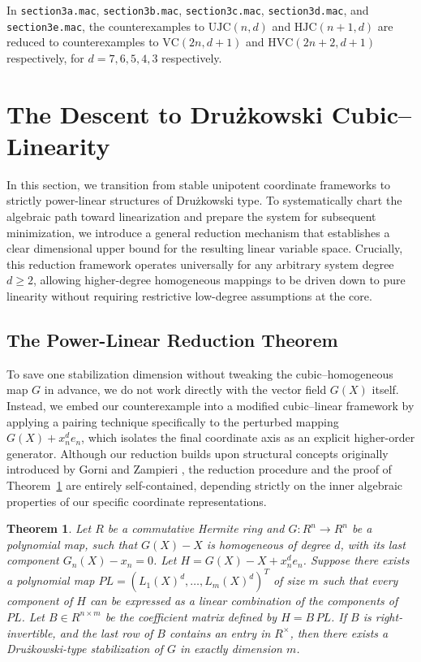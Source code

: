 \documentclass[11pt,a4paper]{article}
\newtheorem{theorem}{Theorem}[section]
\begin{document}
In \texttt{section3a.mac}, \texttt{section3b.mac}, \texttt{section3c.mac}, \texttt{section3d.mac}, and \texttt{section3e.mac}, the counterexamples to $\mathrm{UJC}(n,d)$ and $\mathrm{HJC}(n+1,d)$ are reduced to counterexamples to $\mathrm{VC}(2n,d+1)$ and $\mathrm{HVC}(2n+2,d+1)$ respectively, for $d = 7,6,5,4,3$ respectively.


\section{The Descent to Dru\.{z}kowski Cubic--Linearity}
\label{sec:druz_linearity}

In this section, we transition from stable unipotent coordinate frameworks to strictly power-linear structures of Dru\.{z}kowski type. To systematically chart the algebraic path toward linearization and prepare the system for subsequent minimization, we introduce a general reduction mechanism that establishes a clear dimensional upper bound for the resulting linear variable space. Crucially, this reduction framework operates universally for any arbitrary system degree $d \ge 2$, allowing higher-degree homogeneous mappings to be driven down to pure linearity without requiring restrictive low-degree assumptions at the core.

\subsection{The Power-Linear Reduction Theorem}
\label{subsec:power_linear_theorem}

To save one stabilization dimension without tweaking the cubic--homogeneous map $G$ in advance, we do not work directly with the vector field $G(X)$ itself. Instead, we embed our counterexample into a modified cubic--linear framework by applying a pairing technique specifically to the perturbed mapping $G(X) + x_n^d e_n$, which isolates the final coordinate axis as an explicit higher-order generator. Although our reduction builds upon structural concepts originally introduced by Gorni and Zampieri \cite{GorniZampieri1997}, the reduction procedure and the proof of Theorem~\ref{thm:druz_main} are entirely self-contained, depending strictly on the inner algebraic properties of our specific coordinate representations.

\begin{theorem} \label{thm:druz_main}
Let $R$ be a commutative Hermite ring and $G: R^n \to R^n$ be a polynomial map, such that $G(X) - X$ is homogeneous of degree $d$, with its last component $G_n(X) - x_n = 0$. Let $H = G(X) - X + x_n^d e_n$. Suppose there exists a polynomial map $\mathit{PL} = (L_1(X)^d, \dots, L_m(X)^d)^T$ of size $m$ such that every component of $H$ can be expressed as a linear combination of the components of $\mathit{PL}$. Let $B \in R^{n \times m}$ be the coefficient matrix defined by $H = B\,\mathit{PL}$. If $B$ is right-invertible, and the last row of $B$ contains an entry in $R^{\times}$, then there exists a Drużkowski-type stabilization of $G$ in exactly dimension $m$.
\end{theorem}
\end{document}

